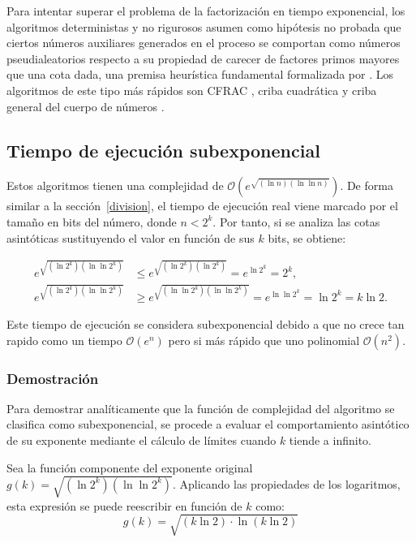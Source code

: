 \documentclass[11pt,a4paper,spanish]{book}
\begin{document}
Para intentar superar el problema de la factorización en tiempo exponencial, los algoritmos deterministas y no rigurosos asumen como hipótesis no probada que ciertos números auxiliares generados en el proceso se comportan como números pseudialeatorios respecto a su propiedad de carecer de factores primos mayores que una cota dada, una premisa heurística fundamental formalizada por \citet{pomerance1982}. Los algoritmos de este tipo más rápidos son CFRAC \citep{morrison1975}, criba cuadrática \citep{pomerance1982} y criba general del cuerpo de números \citep{lenstra1993}.\subsection{Tiempo de ejecución subexponencial}

Estos algoritmos tienen una complejidad de $\mathcal{O} \left(e^{\sqrt{(\ln n)(\ln \ln n)}}\right)$. De forma similar a la sección~\ref{division}, el tiempo de ejecución real viene marcado por el tamaño en bits del número, donde $n < 2^k$. Por tanto, si se analiza las cotas asintóticas sustituyendo el valor en función de sus $k$ bits, se obtiene:

$$\begin{aligned}
    e^{\sqrt{(\ln 2^k) (\ln \ln 2^k)}} & \leq e^{\sqrt{(\ln 2^k) (\ln 2^k)}} = e^{\ln 2^k} = 2^k, \\
    e^{\sqrt{(\ln 2^k) (\ln \ln 2^k)}} & \geq e^{\sqrt{(\ln \ln 2^k) (\ln \ln 2^k)}} = e^{\ln \ln 2^k} = \ln 2^k = k \ln 2.
\end{aligned}$$

Este tiempo de ejecución se considera subexponencial debido a que no crece tan rapido como un tiempo $\mathcal{O}(e^n)$ pero si más rápido que uno polinomial $\mathcal{O}(n^2)$.

\subsubsection{Demostración}

Para demostrar analíticamente que la función de complejidad del algoritmo se clasifica como subexponencial, se procede a evaluar el comportamiento asintótico de su exponente mediante el cálculo de límites cuando $k$ tiende a infinito.

Sea la función componente del exponente original $g(k) = \sqrt{(\ln 2^k)(\ln \ln 2^k)}$. Aplicando las propiedades de los logaritmos, esta expresión se puede reescribir en función de $k$ como:
$$g(k) = \sqrt{(k \ln 2) \cdot \ln(k \ln 2)}$$
\end{document}
